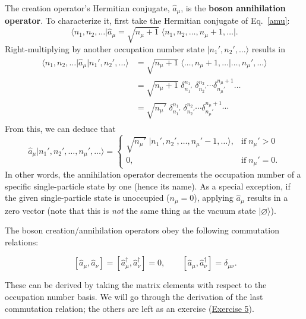 \documentclass[prx,12pt]{revtex4-2}
\begin{document}
The creation operator's Hermitian conjugate, $\hat{a}_\mu$, is the
\textbf{boson annihilation operator}.  To characterize it, first take
the Hermitian conjugate of Eq.~\eqref{amu}:
\begin{equation}
  \big\langle n_1, n_2, \dots\big| \hat{a}_\mu = \sqrt{n_\mu+1} \; \big\langle n_1, n_2, \dots, n_\mu + 1, \dots\big|.
\end{equation}
Right-multiplying by another occupation number state
$|n_1',n_2',\dots\rangle$ results in
\begin{align}
  \begin{aligned}\big\langle n_1, n_2, \dots \big| \hat{a}_\mu \big|n_1',n_2',\dots\big\rangle &= \sqrt{n_\mu+1} \; \big\langle \dots, n_\mu + 1, \dots\big| \dots, n_\mu',\dots\big\rangle \\&= \sqrt{n_\mu+1}\; \delta^{n_1}_{n_1'}\; \delta^{n_2}_{n_2'} \cdots \delta^{n_\mu+1}_{n_\mu'} \dots \\  &= \sqrt{n_\mu'}\; \delta^{n_1}_{n_1'}\; \delta^{n_2}_{n_2'} \cdots \delta^{n_\mu+1}_{n_\mu'}\cdots\end{aligned}
  \end{align}
From this, we can deduce that
\begin{equation}
  \hat{a}_\mu \big|n_1', n_2', \dots, n_\mu', \dots\big\rangle = \begin{cases} \sqrt{n_\mu'} \; \big|n_1', n_2', \dots, n_\mu' - 1, \dots\big\rangle, & \mathrm{if}\; n_\mu' > 0 \\ 0, & \mathrm{if}\; n_\mu' = 0.\end{cases}
\end{equation}
In other words, the annihilation operator decrements the occupation
number of a specific single-particle state by one (hence its name).
As a special exception, if the given single-particle state is
unoccupied ($n_\mu = 0$), applying $\hat{a}_\mu$ results in a zero
vector (note that this is \textit{not} the same thing as the vacuum
state $|\varnothing\rangle$).

The boson creation/annihilation operators obey the following
commutation relations:
\begin{framed}
  \begin{equation}
    \,[\hat{a}_\mu,\hat{a}_\nu] = [\hat{a}_\mu^\dagger,\hat{a}_\nu^\dagger] = 0,
    \qquad [\hat{a}_\mu,\hat{a}_\nu^\dagger] = \delta_{\mu\nu}.
    \label{commutations}
  \end{equation}
\end{framed}
\vskip -0.1in
\noindent
These can be derived by taking the matrix elements with respect to the
occupation number basis.  We will go through the derivation of the
last commutation relation; the others are left as an exercise
(\hyperref[ex:boson_commutators]{Exercise 5}).
\end{document}
